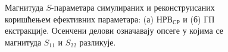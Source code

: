 \documentclass[main.tex]{subfiles}
\begin{document}
\begin{figure}[!t]
\centering
{}
\caption{Магнитуда $S$-параметара симулираних и реконструисаних коришћењем ефективних параметара: (а) $НРВ_{СР}$ и (б) ГП екстракције. Осенчени делови означавају опсеге у којима се магнитуда $S_{11}$ и $S_{22}$ разликује.}
\label{val_pod90_mag}
\end{figure}
\end{document}
